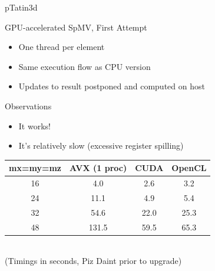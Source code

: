 \begin{frame}{pTatin3d}

  \begin{block}{GPU-accelerated SpMV, First Attempt}
  \begin{itemize}
   \item One thread per element
   \item Same execution flow as CPU version
   \item Updates to result postponed and computed on host
  \end{itemize}
  \end{block}

  \begin{block}{Observations}
   \begin{itemize}
    \item It works!
    \item It's relatively slow (excessive register spilling)
   \end{itemize}
  \end{block}
  
\begin{center}
\begin{tabular}{|c|c|c|c|}
 \hline
 mx=my=mz        & AVX (1 proc) & CUDA & OpenCL \\
 \hline
 \hline
 16              &  4.0         &  2.6  &  3.2  \\
 24              & 11.1         &  4.9  &  5.4  \\
 32              & 54.6         & 22.0  & 25.3 \\
 48              & 131.5        & 59.5  & 65.3  \\
 \hline
\end{tabular} \\
(Timings in seconds, Piz Daint prior to upgrade)
\end{center}
  
\end{frame}


